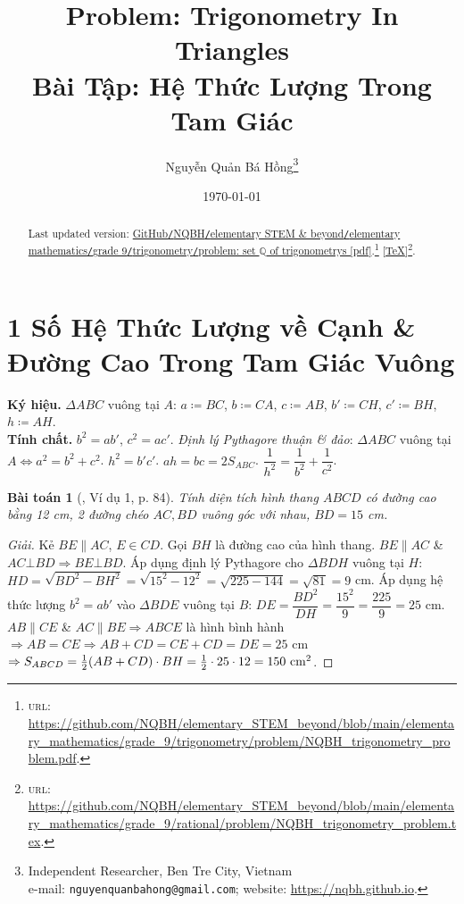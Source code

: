 \documentclass{article}
\title{Problem: Trigonometry In Triangles\\Bài Tập: Hệ Thức Lượng Trong Tam Giác}
\author{Nguyễn Quản Bá Hồng\footnote{Independent Researcher, Ben Tre City, Vietnam\\e-mail: \texttt{nguyenquanbahong@gmail.com}; website: \url{https://nqbh.github.io}.}}
\date{\today}
\newtheorem{baitoan}{Bài toán}
\begin{document}
\maketitle
\begin{abstract}
	Last updated version: \href{https://github.com/NQBH/elementary_STEM_beyond/blob/main/elementary_mathematics/grade_9/trigonometry/problem/NQBH_trigonometry_problem.pdf}{GitHub{\tt/}NQBH{\tt/}elementary STEM \& beyond{\tt/}elementary mathematics{\tt/}grade 9{\tt/}trigonometry{\tt/}problem: set $\mathbb{Q}$ of trigonometrys [pdf]}.\footnote{\textsc{url}: \url{https://github.com/NQBH/elementary_STEM_beyond/blob/main/elementary_mathematics/grade_9/trigonometry/problem/NQBH_trigonometry_problem.pdf}.} [\href{https://github.com/NQBH/elementary_STEM_beyond/blob/main/elementary_mathematics/grade_9/trigonometry/problem/NQBH_trigonometry_problem.tex}{\TeX}]\footnote{\textsc{url}: \url{https://github.com/NQBH/elementary_STEM_beyond/blob/main/elementary_mathematics/grade_9/rational/problem/NQBH_trigonometry_problem.tex}.}. 
\end{abstract}
\tableofcontents


\section{1 Số Hệ Thức Lượng về Cạnh \& Đường Cao Trong Tam Giác Vuông}
\textbf{\textsf{Ký hiệu.}} $\Delta ABC$ vuông tại $A$: $a\coloneqq BC$, $b\coloneqq CA$, $c\coloneqq AB$, $b'\coloneqq CH$, $c'\coloneqq BH$, $h\coloneqq AH$.\\\textbf{\textsf{Tính chất.}}  $b^2 = ab'$, $c^2 = ac'$.  \textit{Định lý Pythagore thuận \& đảo}: $\Delta ABC$ vuông tại $A\Leftrightarrow a^2 = b^2 + c^2$.  $h^2 = b'c'$.  $ah = bc = 2S_{ABC}$.  $\dfrac{1}{h^2} = \dfrac{1}{b^2} + \dfrac{1}{c^2}$.

\begin{baitoan}[\cite{Binh_Toan_9_tap_1}, Ví dụ 1, p. 84]
	Tính diện tích hình thang $ABCD$ có đường cao bằng {\rm12 cm}, 2 đường chéo $AC,BD$ vuông góc với nhau, $BD = 15$ {\rm cm}.
\end{baitoan}

\begin{proof}[Giải]
	Kẻ $BE\parallel AC$, $E\in CD$. Gọi $BH$ là đường cao của hình thang. $BE\parallel AC$ \& $AC\bot BD\Rightarrow BE\bot BD$. Áp dụng định lý Pythagore cho $\Delta BDH$ vuông tại $H$: $HD = \sqrt{BD^2 - BH^2} = \sqrt{15^2 - 12^2} = \sqrt{225 - 144} = \sqrt{81} = 9$ cm. Áp dụng hệ thức lượng $b^2 = ab'$ vào $\Delta BDE$ vuông tại $B$: $DE = \dfrac{BD^2}{DH} = \dfrac{15^2}{9} = \dfrac{225}{9} = 25$ cm. $AB\parallel CE$ \& $AC\parallel BE\Rightarrow ABCE$ là hình bình hành $\Rightarrow AB = CE\Rightarrow AB + CD = CE + CD = DE = 25$ cm $\Rightarrow S_{ABCD} = \frac{1}{2}(AB + CD)\cdot BH = \frac{1}{2}\cdot25\cdot12 = 150\ {\rm cm}^2$.
\end{proof}
\end{document}
